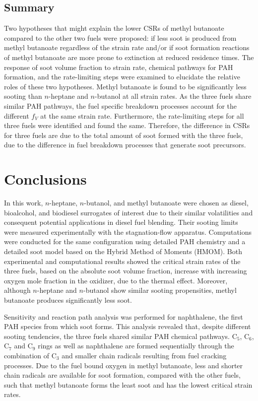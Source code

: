 \documentclass[review,3p,times]{elsarticleUS}
\begin{document}
\subsection{Summary}

Two hypotheses that might explain the lower CSRs of methyl butanoate compared to the other two fuels were proposed: if less soot is produced from methyl butanoate regardless of the strain rate and/or if soot formation reactions of methyl butanoate are more prone to extinction at reduced residence times.  The response of soot volume fraction to strain rate, chemical pathways for PAH formation, and the rate-limiting steps were examined to elucidate the relative roles of these two hypotheses.  Methyl butanoate is found to be significantly less sooting than $n$-heptane and $n$-butanol at all strain rates.  As the three fuels share similar PAH pathways, the fuel specific breakdown processes account for the different $f_V$ at the same strain rate.  Furthermore, the rate-limiting steps for all three fuels were identified and found the same.  Therefore, the difference in CSRs for three fuels are due to the total amount of soot formed with the three fuels, due to the difference in fuel breakdown processes that generate soot precursors.



\section{Conclusions}           

In this work, $n$-heptane, $n$-butanol, and methyl butanoate were chosen as diesel, bioalcohol, and biodiesel surrogates of interest due to their similar volatilities and consequent potential applications in diesel fuel blending. Their sooting limits were measured experimentally with the stagnation-flow apparatus. Computations were conducted for the same configuration using detailed PAH chemistry and a detailed soot model based on the Hybrid Method of Moments (HMOM). Both experimental and computational results showed the critical strain rates of the three fuels, based on the absolute soot volume fraction, increase with increasing oxygen mole fraction in the oxidizer, due to the thermal effect. Moreover, although $n$-heptane and $n$-butanol show similar sooting propensities, methyl butanoate produces significantly less soot.

Sensitivity and reaction path analysis was performed for naphthalene, the first PAH species from which soot forms. This analysis revealed that, despite different sooting tendencies, the three fuels shared similar PAH chemical pathways. C$_5$, C$_6$, C$_7$ and C$_9$ rings as well as naphthalene are formed sequentially through the combination of C$_3$ and smaller chain radicals resulting from fuel cracking processes. Due to the fuel bound oxygen in methyl butanoate, less and shorter chain radicals are available for soot formation, compared with the other fuels, such that methyl butanoate forms the least soot and has the lowest critical strain rates.
\end{document}
